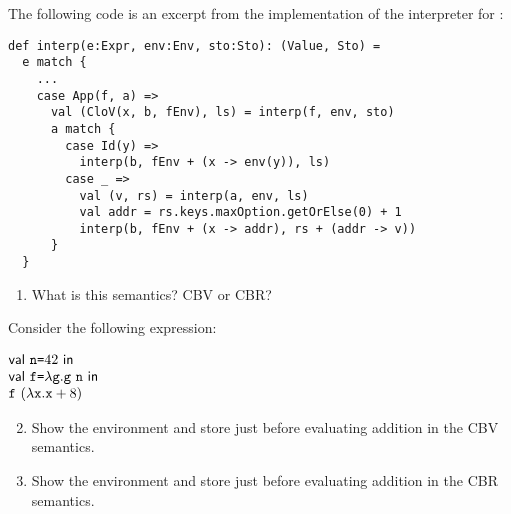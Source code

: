 \begin{exercise}

The following code is an excerpt from the implementation of the interpreter for
\lang:
\begin{verbatim}
def interp(e:Expr, env:Env, sto:Sto): (Value, Sto) =
  e match {
    ...
    case App(f, a) =>
      val (CloV(x, b, fEnv), ls) = interp(f, env, sto)
      a match {
        case Id(y) =>
          interp(b, fEnv + (x -> env(y)), ls)
        case _ =>
          val (v, rs) = interp(a, env, ls)
          val addr = rs.keys.maxOption.getOrElse(0) + 1
          interp(b, fEnv + (x -> addr), rs + (addr -> v))
      }
  }
\end{verbatim}

\begin{enumerate}
  \item What is this semantics? CBV or CBR?
\end{enumerate}

Consider the following expression:

$\begin{array}{@{}l}
  \ebind{\code{n}}{42}{ \\
  \ebind{\code{f}}{\efun{\code{g}}{\eapp{\code{g}}{\code{n}}}}{ \\
  \eapp{\code{f}}{(\efun{\cx}{\eadd{\cx}{8}})}}}
\end{array}$

\begin{enumerate}
\setcounter{enumi}{1}
\item Show the environment and store just before evaluating addition in the CBV semantics.
\item Show the environment and store just before evaluating addition in the CBR semantics.
\end{enumerate}

\end{exercise}

